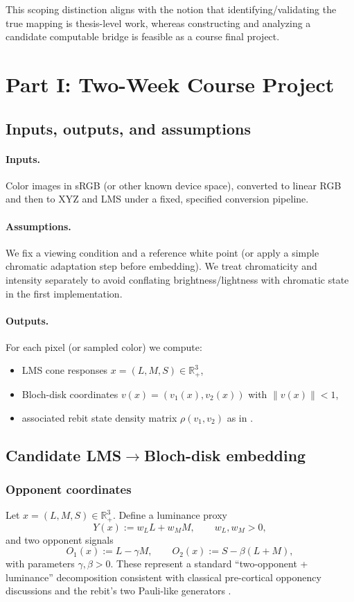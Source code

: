 \documentclass[11pt]{article}
\newcommand{\R}{\mathbb{R}}
\newcommand{\Rp}{\R_{+}}
\newcommand{\norm}[1]{\left\lVert #1 \right\rVert}
\begin{document}
This scoping distinction aligns with the notion that identifying/validating the true mapping is thesis-level work, whereas constructing and analyzing a candidate computable bridge is feasible as a course final project.

\section{Part I: Two-Week Course Project}

\subsection{Inputs, outputs, and assumptions}
\paragraph{Inputs.}
Color images in sRGB (or other known device space), converted to linear RGB and then to XYZ and LMS under a fixed, specified conversion pipeline.

\paragraph{Assumptions.}
We fix a viewing condition and a reference white point (or apply a simple chromatic adaptation step before embedding).
We treat chromaticity and intensity separately to avoid conflating brightness/lightness with chromatic state in the first implementation.

\paragraph{Outputs.}
For each pixel (or sampled color) we compute:
\begin{itemize}[leftmargin=2.2em]
\item LMS cone responses $x=(L,M,S)\in\Rp^3$,
\item Bloch-disk coordinates $v(x)=(v_1(x),v_2(x))$ with $\norm{v(x)}<1$,
\item associated rebit state density matrix $\rho(v_1,v_2)$ as in \cite{Berthier2020}.
\end{itemize}

\subsection{Candidate LMS$\to$Bloch-disk embedding}

\subsubsection{Opponent coordinates}
Let $x=(L,M,S)\in\Rp^3$.
Define a luminance proxy
\begin{equation}
Y(x) := w_L L + w_M M,\qquad w_L,w_M>0,
\end{equation}
and two opponent signals
\begin{equation}
O_1(x) := L - \gamma M,\qquad
O_2(x) := S - \beta(L+M),
\end{equation}
with parameters $\gamma,\beta>0$.
These represent a standard ``two-opponent + luminance'' decomposition consistent with classical pre-cortical opponency discussions and the rebit's two Pauli-like generators \cite{Berthier2020}.
\end{document}
